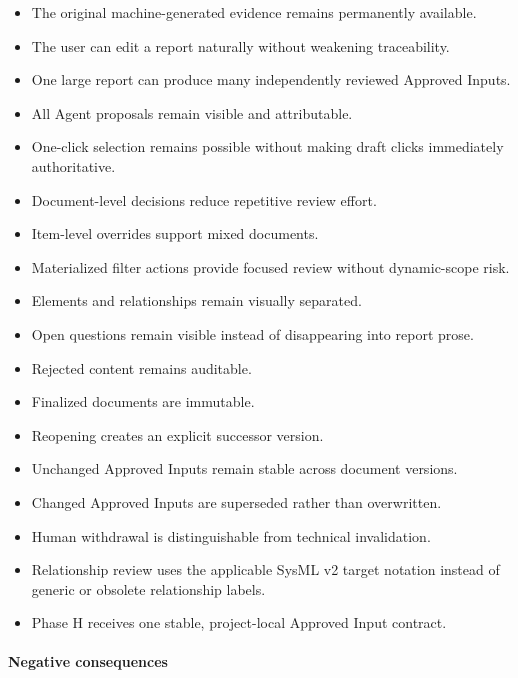 \begin{itemize}
\tightlist
\item
  The original machine-generated evidence remains permanently available.
\item
  The user can edit a report naturally without weakening traceability.
\item
  One large report can produce many independently reviewed Approved Inputs.
\item
  All Agent proposals remain visible and attributable.
\item
  One-click selection remains possible without making draft clicks immediately authoritative.
\item
  Document-level decisions reduce repetitive review effort.
\item
  Item-level overrides support mixed documents.
\item
  Materialized filter actions provide focused review without dynamic-scope risk.
\item
  Elements and relationships remain visually separated.
\item
  Open questions remain visible instead of disappearing into report prose.
\item
  Rejected content remains auditable.
\item
  Finalized documents are immutable.
\item
  Reopening creates an explicit successor version.
\item
  Unchanged Approved Inputs remain stable across document versions.
\item
  Changed Approved Inputs are superseded rather than overwritten.
\item
  Human withdrawal is distinguishable from technical invalidation.
\item
  Relationship review uses the applicable SysML v2 target notation instead of generic or obsolete relationship labels.
\item
  Phase H receives one stable, project-local Approved Input contract.
\end{itemize}

\hypertarget{negative-consequences-1}{%
\paragraph{Negative consequences}\label{negative-consequences-1}}

